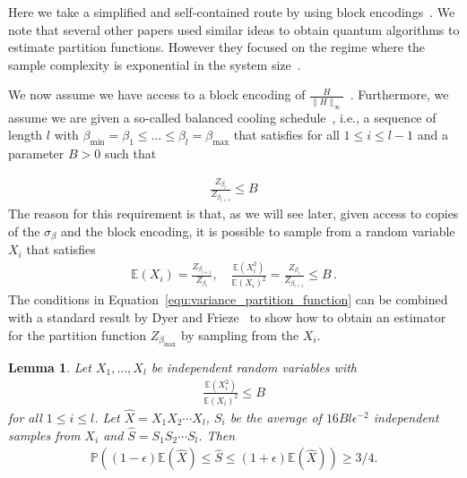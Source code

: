 \documentclass[aps,pra,amsmath,amssymb,twocolumn,10pt]{revtex4-2}
\newtheorem{lemma}[thm]{Lemma}
\theoremstyle{definition}
\begin{document}
Here we take a simplified and self-contained route by using block encodings~\cite{Gilyn2019}. We note that several other papers used similar ideas to obtain quantum algorithms to estimate partition functions. However they focused on the regime where the sample complexity is exponential in the system size~\cite{randomized_matrix_signal,Jackson2023,Chowdhury2021}.


We now assume we have access to a block encoding of $\frac{H}{\|H\|_\infty}$~\cite{Gilyn2019}. Furthermore, we assume we are given a so-called balanced cooling schedule~\cite{Stefankovic2007}, i.e., a sequence of length $l$ with $\beta_{\min}=\beta_1 \leq\ldots\leq\beta_l=\beta_{\max}$ that satisfies for all $1\leq i\leq l-1$ and a parameter $B>0$ such that

\begin{align}\label{equ:good_schedule}
	\frac{Z_{\beta_{i}}}{Z_{\beta_{i+1}}} \leq B
\end{align}
The reason for this requirement is that, as we will see later, given access to copies of the $\sigma_{\beta}$ and the block encoding, it is possible to sample from a random variable $X_i$ that satisfies
\begin{align}\label{equ:variance_partition_function}
	\mathbb{E}\left(X_{i}\right)=\frac{Z_{\beta_{i+1}}}{Z_{\beta_{i}}},\quad \frac{\mathbb{E}\left(X_{i}^{2}\right)}{\mathbb{E}\left(X_{i}\right)^{2}} = \frac{Z_{\beta_{i}}}{Z_{\beta_{i+1}}} \leq B\,.
\end{align}
The conditions in Equation~\eqref{equ:variance_partition_function} can be combined with a standard result by Dyer and Frieze~\cite{dyer1991computing} to show how to obtain an estimator for the partition function $Z_{\beta_{\max}}$ by sampling from the $X_i$.
\begin{lemma}\label{lemma:frieze}
	Let $X_1,\ldots,X_l$ be independent random variables with 
	\begin{align}
		\frac{\mathbb{E}\left(X_{i}^{2}\right)}{\mathbb{E}\left(X_{i}\right)^{2}}\leq B
	\end{align}
	for all $1\leq i\leq l$. Let $\hat{X}=X_1X_2\cdots X_l$, $S_i$ be the average of $16Bl\epsilon^{-2}$ independent samples from $X_i$ and $\hat{S}=S_1S_2\cdots S_l$. Then
	\begin{align}
		\mathbb{P}((1-\epsilon)\mathbb{E}(\hat{X})\leq\hat{S}\leq (1+\epsilon)\mathbb{E}(\hat{X}))\geq 3/4.
	\end{align}
\end{lemma}
\end{document}
